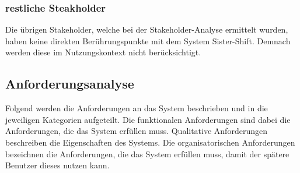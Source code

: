 \documentclass[11pt,
paper=a4,
bibtotocnumbered,	  %
liststotocnumbered,  %
DIV=calc,		  %
tablecaptionabove,	  %
headinclude,
]{article}
\begin{document}
\subsubsection{restliche Steakholder}
Die übrigen Stakeholder, welche bei der Stakeholder-Analyse ermittelt wurden, haben keine direkten Berührungspunkte mit dem System Sister-Shift. Demnach werden diese im Nutzungskontext nicht berücksichtigt. 
\subsection{Anforderungsanalyse}
Folgend werden die Anforderungen an das System beschrieben und in die jeweiligen Kategorien aufgeteilt. Die funktionalen Anforderungen sind dabei die Anforderungen, die das System erfüllen muss. Qualitative Anforderungen beschreiben die Eigenschaften des Systems. Die organisatorischen Anforderungen bezeichnen die Anforderungen, die das System erfüllen muss, damit der spätere Benutzer dieses nutzen kann.
\end{document}
